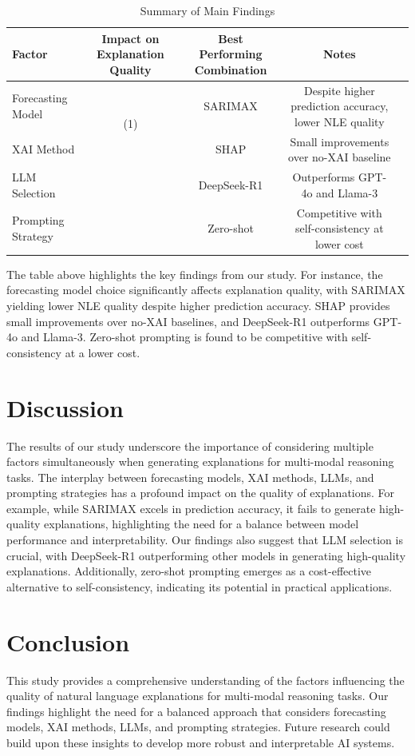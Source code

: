 \begin{table}[htbp]
\centering
\begin{tabular}{|l|c|c|c|c|}
\hline
Factor & Impact on Explanation Quality & Best Performing Combination & Notes \\
\hline
Forecasting Model & \multirow{2}{*}{(1)} & SARIMAX & Despite higher prediction accuracy, lower NLE quality \\
XAI Method & & SHAP & Small improvements over no-XAI baseline \\
LLM Selection & & DeepSeek-R1 & Outperforms GPT-4o and Llama-3 \\
Prompting Strategy & & Zero-shot & Competitive with self-consistency at lower cost \\
\hline
\end{tabular}
\caption{Summary of Main Findings}
\label{tab:results}
\end{table}

The table above highlights the key findings from our study. For instance, the forecasting model choice significantly affects explanation quality, with SARIMAX yielding lower NLE quality despite higher prediction accuracy. SHAP provides small improvements over no-XAI baselines, and DeepSeek-R1 outperforms GPT-4o and Llama-3. Zero-shot prompting is found to be competitive with self-consistency at a lower cost.

\section{Discussion}
\label{sec:discussion}
The results of our study underscore the importance of considering multiple factors simultaneously when generating explanations for multi-modal reasoning tasks. The interplay between forecasting models, XAI methods, LLMs, and prompting strategies has a profound impact on the quality of explanations. For example, while SARIMAX excels in prediction accuracy, it fails to generate high-quality explanations, highlighting the need for a balance between model performance and interpretability. Our findings also suggest that LLM selection is crucial, with DeepSeek-R1 outperforming other models in generating high-quality explanations. Additionally, zero-shot prompting emerges as a cost-effective alternative to self-consistency, indicating its potential in practical applications.

\section{Conclusion}
\label{sec:conclusion}
This study provides a comprehensive understanding of the factors influencing the quality of natural language explanations for multi-modal reasoning tasks. Our findings highlight the need for a balanced approach that considers forecasting models, XAI methods, LLMs, and prompting strategies. Future research could build upon these insights to develop more robust and interpretable AI systems.

